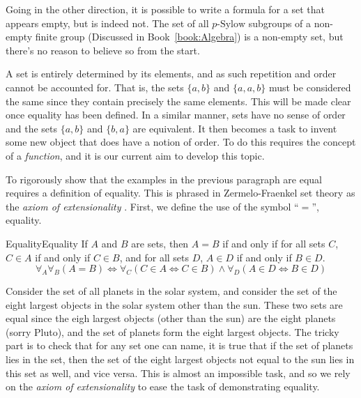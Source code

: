         \begin{example}
            Going in the other direction, it is possible to write a formula for
            a set that appears empty, but is indeed not. The set of all
            $p\textrm{-Sylow}$ subgroups of a non-empty finite group
            (Discussed in Book~\ref{book:Algebra}) is a non-empty set, but
            there's no reason to believe so from the start.
        \end{example}
        A set is entirely determined by its elements, and as such repetition and
        order cannot be accounted for. That is, the sets $\{a,b\}$ and
        $\{a,a,b\}$ must be considered the same since they contain precisely the
        same elements. This will be made clear once equality has been defined.
        In a similar manner, sets have no sense of order and the sets $\{a,b\}$
        and $\{b,a\}$ are equivalent. It then becomes a task to invent some new
        object that does have a notion of order. To do this requires the concept
        of a \textit{function}, and it is our current aim to develop this topic.
        \par\hfill\par
        To rigorously show that the examples in the previous paragraph are equal
        requires a definition of equality. This is phrased in Zermelo-Fraenkel
        set theory as the \textit{axiom of extensionality}%
        . First, we define the use of the symbol
        ``$=$'', equality.
        \begin{fnotation}{Equality}{Equality}
            If $A$ and $B$ are sets, then $A=B$ if and only if for all sets
            $C$, $C\in{A}$ if and only if $C\in{B}$, and for all sets $D$,
            $A\in{D}$ if and only if $B\in{D}$.
            \begin{equation*}
                \forall_{A}\forall_{B}(A=B)
                \Leftrightarrow\forall_{C}(C\in{A}\Leftrightarrow{C}\in{B})
                \land\forall_{D}(A\in{D}\Leftrightarrow{B}\in{D})
            \end{equation*}
        \end{fnotation}
        \begin{example}
            Consider the set of all planets in the solar system, and consider
            the set of the eight largest objects in the solar system other than
            the sun. These two sets are equal since the eigh largest objects
            (other than the sun) are the eight planets (sorry Pluto), and the
            set of planets form the eight largest objects. The tricky part is
            to check that for any set one can name, it is true that if the set
            of planets lies in the set, then the set of the eight largest
            objects not equal to the sun lies in this set as well, and vice
            versa. This is almost an impossible task, and so we rely on the
            \textit{axiom of extensionality} to ease the task of demonstrating
            equality.
        \end{example} 
